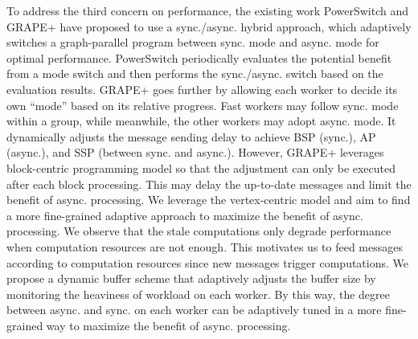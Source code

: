 To address the third concern on performance, the existing work PowerSwitch \cite{Xie2015SYNC} and GRAPE+ \cite{Fan2018Adaptive} have proposed to use a sync./async. hybrid approach, which adaptively switches a graph-parallel program between sync. mode and async. mode for optimal performance. PowerSwitch \cite{Xie2015SYNC} periodically evaluates the potential benefit from a mode switch and then performs the sync./async. switch based on the evaluation results. GRAPE+ \cite{Fan2018Adaptive} goes further by allowing each worker to decide its own ``mode'' based on its relative progress. Fast workers may follow sync. mode within a group, while meanwhile, the other workers may adopt async. mode. It dynamically adjusts the message sending delay to achieve BSP (sync.), AP (async.), and SSP (between sync. and async.). However, GRAPE+ leverages block-centric programming model so that the adjustment can only be executed after each block processing. This may delay the up-to-date messages and limit the benefit of async. processing. We leverage the vertex-centric model and aim to find a more fine-grained adaptive approach to maximize the benefit of async. processing. We observe that the stale computations only degrade performance when computation resources are not enough. This motivates us to feed messages according to computation resources since new messages trigger computations. We propose a dynamic buffer scheme that adaptively adjusts the buffer size by monitoring the heaviness of workload on each worker. By this way, the degree between async. and sync. on each worker can be adaptively tuned in a more fine-grained way to maximize the benefit of async. processing.



